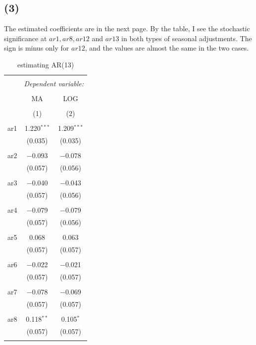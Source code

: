 \documentclass{article}
\begin{document}
\subsection{(3)}
 The estimated coefficients are in the next page. By the table, I see the stochastic significance at $ar1, ar8, ar12$ and $ar13$ in both types of seasonal adjustments. The sign is minus only for $ar12$, and the values are almost the same in the two cases.
 \begin{table}[!htbp] \centering 
  \caption{estimating AR(13)} 
  \label{} 
\begin{tabular}{@{\extracolsep{5pt}}lcc} 
\\[-1.8ex]\hline 
\hline \\[-1.8ex] 
 & \multicolumn{2}{c}{\textit{Dependent variable:}} \\ 
\cline{2-3} 
\\[-1.8ex] & MA & LOG \\ 
\\[-1.8ex] & (1) & (2)\\ 
\hline \\[-1.8ex] 
 ar1 & 1.220$^{***}$ & 1.209$^{***}$ \\ 
  & (0.035) & (0.035) \\ 
  & & \\ 
 ar2 & $-$0.093 & $-$0.078 \\ 
  & (0.057) & (0.056) \\ 
  & & \\ 
 ar3 & $-$0.040 & $-$0.043 \\ 
  & (0.057) & (0.056) \\ 
  & & \\ 
 ar4 & $-$0.079 & $-$0.079 \\ 
  & (0.057) & (0.056) \\ 
  & & \\ 
 ar5 & 0.068 & 0.063 \\ 
  & (0.057) & (0.057) \\ 
  & & \\ 
 ar6 & $-$0.022 & $-$0.021 \\ 
  & (0.057) & (0.057) \\ 
  & & \\ 
 ar7 & $-$0.078 & $-$0.069 \\ 
  & (0.057) & (0.057) \\ 
  & & \\ 
 ar8 & 0.118$^{**}$ & 0.105$^{*}$ \\ 
  & (0.057) & (0.057) \\ 
  & & \\ 

\end{tabular}
\end{table}
\end{document}
